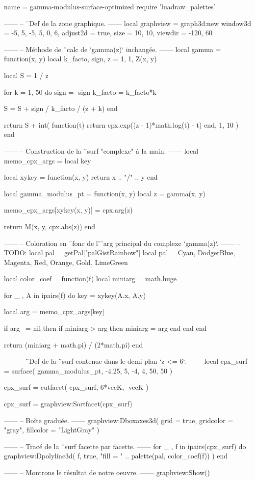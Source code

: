 \documentclass{standalone}
\begin{document}
\begin{luadraw}{name = gamma-modulus-surface-optimized}
require 'luadraw_palettes'

------
-- ¨Def de la zone graphique.
------
local graphview = graph3d:new{
  window3d = {-5, 5, -5, 5, 0, 6},
  adjust2d = true,
  size     = {10, 10},
  viewdir  = {-120, 60}
}

------
-- Méthode de ¨calc de `gamma(z)` inchangée.
------
local gamma = function(x, y)
  local k_facto, sign, z = 1, 1, Z(x, y)

  local S = 1 / z

  for k = 1, 50 do
    sign    = -sign
    k_facto = k_facto*k

    S = S + sign / k_facto / (z + k)
  end

  return S + int(
    function(t)
      return cpx.exp((z - 1)*math.log(t) - t)
    end,
    1, 10
  )
end

------
-- Construction de la ¨surf "complexe" à la main.
------
local memo_cpx_args = {}
local key

local xykey = function(x, y)
    return x .. "/" .. y
end

local gamma_modulus_pt = function(x, y)
  local z = gamma(x, y)

  memo_cpx_args[xykey(x, y)] = cpx.arg(z)

  return M(x, y, cpx.abs(z))
end

------
-- Coloration en ¨fonc de l'¨arg principal du complexe `gamma(z)`.
------
-- TODO: local pal = getPal["palGistRainbow"]
local pal = {Cyan, DodgerBlue, Magenta, Red, Orange, Gold, LimeGreen}

local color_coef = function(f)
  local miniarg = math.huge

  for _ , A in ipairs(f) do
    key = xykey(A.x, A.y)

    local arg = memo_cpx_args[key]

    if arg ~= nil then
      if miniarg > arg then
        miniarg = arg
      end
    end
  end

  return (miniarg + math.pi) / (2*math.pi)
end

------
-- ¨Def de la ¨surf contenue dans le demi-plan `z <= 6`.
------
local cpx_surf = surface(
  gamma_modulus_pt,
  -4.25, 5, -4, 4,
  {50, 50}
)

cpx_surf = cutfacet(
  cpx_surf,
  {6*vecK, -vecK}
)

cpx_surf = graphview:Sortfacet(cpx_surf)

------
-- Boîte graduée.
------
graphview:Dboxaxes3d({
  grid      = true,
  gridcolor = "gray",
  fillcolor = "LightGray"
})

------
-- Tracé de la ¨surf facette par facette.
------
for _ , f in ipairs(cpx_surf) do
  graphview:Dpolyline3d(
    f,
    true,
       "fill = "
    .. palette(pal, color_coef(f))
  )
end

------
-- Montrons le résultat de notre oeuvre.
------
graphview:Show()
\end{luadraw}
\end{document}
